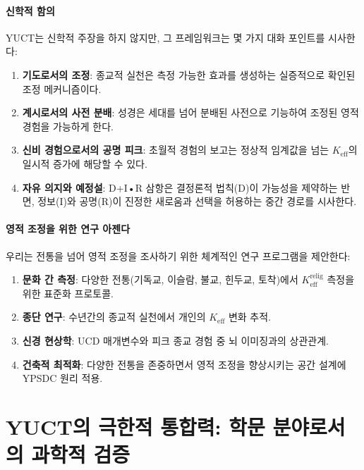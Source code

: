 \documentclass[12pt,a4paper]{article}
\begin{document}
	\subsection{신학적 함의}
	
	YUCT는 신학적 주장을 하지 않지만, 그 프레임워크는 몇 가지 대화 포인트를 시사한다:
	\begin{enumerate}
		\item \textbf{기도로서의 조정}: 종교적 실천은 측정 가능한 효과를 생성하는 실증적으로 확인된 조정 메커니즘이다.
		
		\item \textbf{계시로서의 사전 분배}: 성경은 세대를 넘어 분배된 사전으로 기능하여 조정된 영적 경험을 가능하게 한다.
		
		\item \textbf{신비 경험으로서의 공명 피크}: 초월적 경험의 보고는 정상적 임계값을 넘는 $K_{\mathrm{eff}}$의 일시적 증가에 해당할 수 있다.
		
		\item \textbf{자유 의지와 예정설}: D+I•R 삼항은 결정론적 법칙(D)이 가능성을 제약하는 반면, 정보(I)와 공명(R)이 진정한 새로움과 선택을 허용하는 중간 경로를 시사한다.
	\end{enumerate}
	
	\subsection{영적 조정을 위한 연구 아젠다}
	
	우리는 전통을 넘어 영적 조정을 조사하기 위한 체계적인 연구 프로그램을 제안한다:
	\begin{enumerate}
		\item \textbf{문화 간 측정}: 다양한 전통(기독교, 이슬람, 불교, 힌두교, 토착)에서 $K_{\mathrm{eff}}^{\mathrm{relig}}$ 측정을 위한 표준화 프로토콜.
		
		\item \textbf{종단 연구}: 수년간의 종교적 실천에서 개인의 $K_{\mathrm{eff}}$ 변화 추적.
		
		\item \textbf{신경 현상학}: UCD 매개변수와 피크 종교 경험 중 뇌 이미징과의 상관관계.
		
		\item \textbf{건축적 최적화}: 다양한 전통을 존중하면서 영적 조정을 향상시키는 공간 설계에 YPSDC 원리 적용.
	\end{enumerate}
	
	\newpage
	\part{YUCT의 극한적 통합력: 학문 분야로서의 과학적 검증}
	
\end{document}

